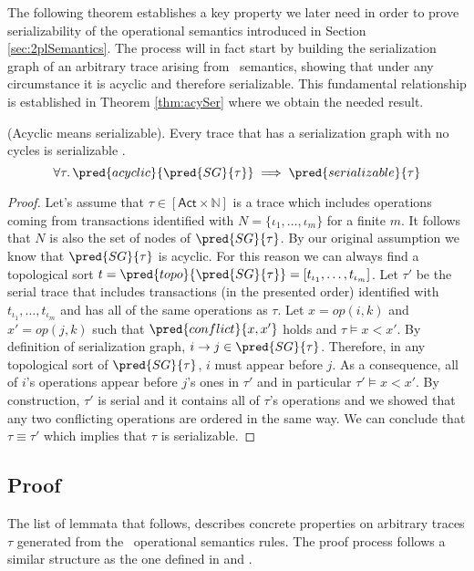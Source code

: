 The following theorem establishes a key property we later need in order to prove serializability of the operational semantics introduced in Section \ref{sec:2plSemantics}. The process will in fact start by building the serialization graph of an arbitrary trace arising from \tpl\ semantics, showing that under any circumstance it is acyclic and therefore serializable. This fundamental relationship is established in Theorem \ref{thm:acySer} where we obtain the needed result.
\begin{thm}
	\label{thm:acySer}
	(Acyclic means serializable).
	Every trace that has a serialization graph with no cycles is serializable \cite{ccontrol}.
	\[
		\forall \tau \ldotp \pred{acyclic}{\pred{SG}{\tau}} \implies \pred{serializable}{\tau}
	\]
	
	\begin{proof}
	Let's assume that $\tau \in [\mathsf{Act} \times \mathds{N}]$ is a trace which includes operations coming from transactions identified with $N = \{ \iota_1, \ldots, \iota_m \}$ for a finite $m$. It follows that $N$ is also the set of nodes of $\pred{SG}{\tau}$. By our original assumption we know that $\pred{SG}{\tau}$ is acyclic. For this reason we can always find a topological sort $t = \pred{topo}{\pred{SG}{\tau}} = [t_{\iota_1}, \ldots, t_{\iota_m}]$. Let $\tau'$ be the serial trace that includes transactions (in the presented order) identified with $t_{\iota_1}, \ldots, t_{\iota_m}$ and has all of the same operations as $\tau$. Let $x = op(i, k)$ and $x' = op(j, k)$ such that $\pred{conflict}{x, x'}$ holds and $\tau \vDash x < x'$. By definition of serialization graph, $i \rightarrow j \in \pred{SG}{\tau}$. Therefore, in any topological sort of $\pred{SG}{\tau}$, $i$ must appear before $j$. As a consequence, all of $i$'s operations appear before $j$'s ones in $\tau'$ and in particular $\tau' \vDash x < x'$. By construction, $\tau'$ is serial and it contains all of $\tau$'s operations and we showed that any two conflicting operations are ordered in the same way. We can conclude that $\tau \equiv \tau'$ which implies that $\tau$ is serializable.
	\end{proof}
\end{thm}

\tocless\subsection{Proof}

The list of lemmata that follows, describes concrete properties on arbitrary traces $\tau$ generated from the \tpl\ operational semantics rules. The proof process follows a similar structure as the one defined in \cite{papa} and \cite{ccontrol}.

